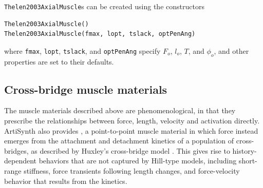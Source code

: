 {\tt Thelen2003AxialMuscle}s can be created using the constructors
\begin{lstlisting}[]
Thelen2003AxialMuscle()
Thelen2003AxialMuscle(fmax, lopt, tslack, optPenAng)
\end{lstlisting}
%
where {\tt fmax}, {\tt lopt}, {\tt tslack}, and {\tt optPenAng}
specify $F_{o}$, $l_o$, $T$, and $\phi_o$, and other properties are
set to their defaults.

\subsection{Cross-bridge muscle materials}
\label{HuxleyAxialMuscle:sec}

The muscle materials described above are phenomenological, in that
they prescribe the relationships between force, length, velocity and
activation directly. ArtiSynth also provides
, a
point-to-point muscle material in which force instead emerges from
the attachment and detachment kinetics of a population of
cross-bridges, as described by Huxley's cross-bridge model
\cite{huxley1957muscle}. This gives rise to history-dependent
behaviors that are not captured by Hill-type models, including
short-range stiffness, force transients following length changes, and
force-velocity behavior that results from the kinetics.

